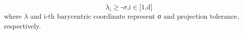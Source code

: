\begin{equation} \label{eq:projtol}
	\lambda _i\text{$\geq $-$\sigma $,i$\in $[1,d]}
\end{equation}
where $\lambda$ and $\text{i-th barycentric coordinate}$ represent σ and projection tolerance, respectively.